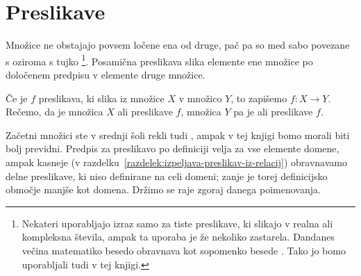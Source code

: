 \section{Preslikave}

Množice ne obstajajo povsem ločene ena od druge, pač pa so med sabo povezane s  oziroma s tujko \footnote{Nekateri uporabljajo izraz  samo za tiste preslikave, ki slikajo v realna ali kompleksna števila, ampak ta uporaba je že nekoliko zastarela. Dandanes večina matematiko besedo  obravnava kot sopomenko besede . Tako jo bomo uporabljali tudi v tej knjigi.}. Posamična preslikava slika elemente ene množice po določenem predpisu v elemente druge množice.

Če je $f$ preslikava, ki slika iz množice $X$ v množico $Y$, to zapišemo $f\colon X \to Y$. Rečemo, da je množica $X$  ali  preslikave $f$, množica $Y$ pa je  ali  preslikave $f$.

Začetni množici ste v srednji šoli rekli tudi , ampak v tej knjigi bomo morali biti bolj previdni. Predpis za preslikavo po definiciji velja za vse elemente domene, ampak kasneje (v razdelku~\ref{razdelek:izpeljava-preslikav-iz-relacij}) obravnavamo delne preslikave, ki niso definirane na celi domeni; zanje je torej definicijsko območje manjše kot domena. Držimo se raje zgoraj danega poimenovanja.

